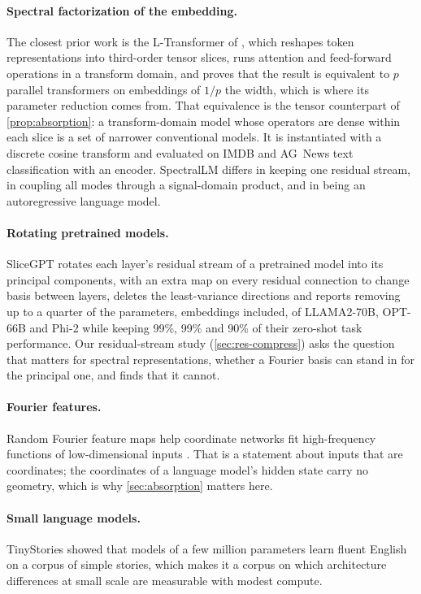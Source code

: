 \paragraph{Spectral factorization of the embedding.} The closest prior work is
the L-Transformer of \citet{elichi2026structured}, which reshapes token
representations into third-order tensor slices, runs attention and
feed-forward operations in a transform domain, and proves that the result is
equivalent to $p$ parallel transformers on embeddings of $1/p$ the width,
which is where its parameter reduction comes from. That equivalence is the
tensor counterpart of \cref{prop:absorption}: a transform-domain model whose
operators are dense within each slice is a set of narrower conventional
models. It is instantiated with a discrete cosine transform and evaluated on
IMDB and AG~News text classification with an encoder. SpectralLM differs in
keeping one residual stream, in coupling all modes through a signal-domain
product, and in being an autoregressive language model.

\paragraph{Rotating pretrained models.} SliceGPT \citep{ashkboos2024slicegpt}
rotates each layer's residual stream of a pretrained model into its principal
components, with an extra map on every residual connection to change basis
between layers, deletes the least-variance directions and reports removing up
to a quarter of the parameters, embeddings included, of LLAMA2-70B, OPT-66B and
Phi-2 while keeping 99\%, 99\% and 90\% of their zero-shot task performance. Our
residual-stream study (\cref{sec:res-compress}) asks the question that matters
for spectral representations, whether a Fourier basis can stand in for the
principal one, and finds that it cannot.

\paragraph{Fourier features.} Random Fourier feature maps help coordinate
networks fit high-frequency functions of low-dimensional inputs
\citep{tancik2020fourierfeatures}. That is a statement about inputs that are
coordinates; the coordinates of a language model's hidden state carry no
geometry, which is why \cref{sec:absorption} matters here.

\paragraph{Small language models.} TinyStories \citep{eldan2023tinystories}
showed that models of a few million parameters learn fluent English on a
corpus of simple stories, which makes it a corpus on which architecture
differences at small scale are measurable with modest compute.
